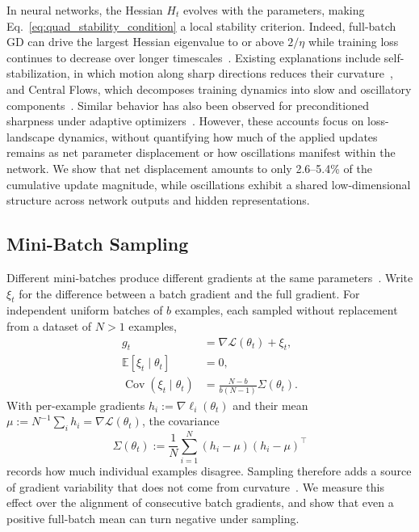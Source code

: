 In neural networks, the Hessian $H_t$ evolves with the parameters, making Eq.~\eqref{eq:quad_stability_condition} a local stability criterion. Indeed, full-batch GD can drive the largest Hessian eigenvalue to or above $2/\eta$ while training loss continues to decrease over longer timescales~\cite{cohen2021edge,arora2022understanding}. Existing explanations include self-stabilization, in which motion along sharp directions reduces their curvature~\cite{damian2023self}, and Central Flows, which decomposes training dynamics into slow and oscillatory components~\cite{cohen2025central}. Similar behavior has also been observed for preconditioned sharpness under adaptive optimizers~\cite{cohen2022adaptive}. However, these accounts focus on loss-landscape dynamics, without quantifying how much of the applied updates remains as net parameter displacement or how oscillations manifest within the network. We show that net displacement amounts to only 2.6--5.4\% of the cumulative update magnitude, while oscillations exhibit a shared low-dimensional structure across network outputs and hidden representations.

\subsection{Mini-Batch Sampling}

Different mini-batches produce different gradients at the same parameters~\cite{mandt2017sgd,hu2019diffusion,jastrzebski2018three}. Write $\xi_t$ for the difference between a batch gradient and the full gradient. For independent uniform batches of $b$ examples, each sampled without replacement from a dataset of $N>1$ examples,
\begin{equation}
\begin{aligned}
g_t&=\nabla\mathcal L(\theta_t)+\xi_t,\\
\mathbb E[\xi_t\mid\theta_t]&=0,\\
\operatorname{Cov}(\xi_t\mid\theta_t)
  &=\frac{N-b}{b(N-1)}\Sigma(\theta_t).
\end{aligned}
\label{eq:sgd_noise_decomposition}
\end{equation}
With per-example gradients $h_i:=\nabla\ell_i(\theta_t)$ and their mean $\mu:=N^{-1}\sum_i h_i=\nabla\mathcal L(\theta_t)$, the covariance
\begin{equation}
  \Sigma(\theta_t)
  :=\frac{1}{N}\sum_{i=1}^{N}(h_i-\mu)(h_i-\mu)^\top
  \label{eq:grad_cov_def}
\end{equation}
records how much individual examples disagree. Sampling therefore adds a source of gradient variability that does not come from curvature~\cite{andreyev2025stochastic}. We measure this effect over the alignment of consecutive batch gradients, and show that even a positive full-batch mean can turn negative under sampling.

